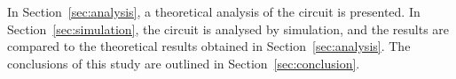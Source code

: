 In Section~\ref{sec:analysis}, a theoretical analysis of the circuit is
presented. In Section~\ref{sec:simulation}, the circuit is analysed by
simulation, and the results are compared to the theoretical results obtained in
Section~\ref{sec:analysis}. The conclusions of this study are outlined in
Section~\ref{sec:conclusion}. \\

\pagebreak

